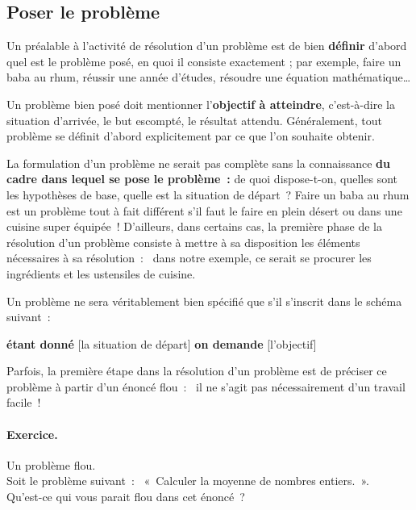 		\subsection{Poser le problème}
		
			Un préalable à l’activité de résolution d’un problème 
			est de bien \textbf{définir} d’abord 
			quel est le problème posé, 
			en quoi il consiste exactement ; 
			par exemple, faire un baba au rhum, 
			réussir une année d’études, 
			résoudre une équation mathématique\dots
			
			Un problème bien posé doit mentionner 
			l’\textbf{objectif à atteindre},
			c’est-à-dire la situation d’arrivée, 
			le but escompté, le résultat attendu. 
			Généralement, tout problème se définit d’abord explicitement
			par ce que l’on souhaite obtenir.
			
			La formulation d’un problème ne serait pas complète 
			sans la connaissance
			\textbf{du cadre dans lequel se pose le problème~:}
			de quoi dispose-t-on, quelles sont les hypothèses de base, 
			quelle est la situation de départ~? 
			Faire un baba au rhum est un problème tout à fait différent 
			s’il faut le faire en plein désert 
			ou dans une cuisine super équipée~! 
			D’ailleurs, dans certains cas, 
			la première phase de la résolution d’un problème 
			consiste à mettre à sa disposition 
			les éléments nécessaires à sa résolution~:~
			dans notre exemple, 
			ce serait se procurer les ingrédients 
			et les ustensiles de cuisine.
		
			Un problème ne sera véritablement bien spécifié 
			que s’il s’inscrit dans le schéma suivant~:
			
			\begin{center}
			\begin{Ovalbox}
				{\textbf{étant donné} [la situation de départ] 
				\textbf{on demande} [l’objectif]}
			\end{Ovalbox}
			\end{center}
		
			Parfois, la première étape dans la résolution d’un problème 
			est de préciser ce problème à partir d’un énoncé flou~:~
			il ne s’agit pas nécessairement d’un travail facile~!
	
			\begin{Emphase}
				\paragraph{Exercice.} Un problème flou.\\
				Soit le problème suivant~:~
				«~Calculer la moyenne de nombres entiers.~».
				\\Qu’est-ce qui vous parait flou dans cet énoncé~?
			\end{Emphase}
			
